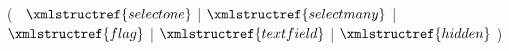 ( 
$~$ $\xmlstructref{selectone}$ 
| $\xmlstructref{selectmany}$ 
| $\xmlstructref{flag}$ 
| $\xmlstructref{textfield}$ 
| $\xmlstructref{hidden}$ 
)


